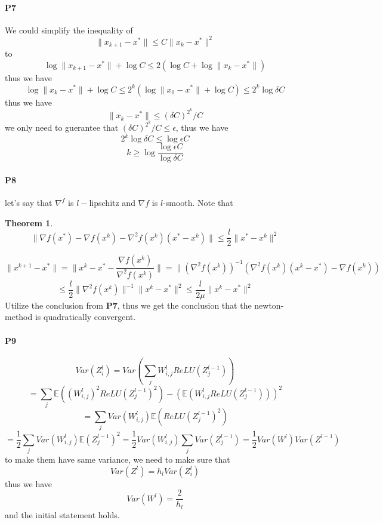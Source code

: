 \documentclass[a4 paper,12pt]{article}
\theoremstyle{definitionstyle}
\newtheorem{thm}{Theorem}
\newenvironment{framedminipage}
    {\begin{framed}\begin{minipage}{0.9\textwidth}}
    {\end{minipage}\end{framed}}
\begin{document}
\paragraph{P7}
We could simplify the inequality of 
\[
  \|x_{k+1}-x^*\|\le C\|x_k-x^*\|^2
\]
to 
\[
  \log\|x_{k+1}-x^*\|+\log C\le 2\left(\log C+\log\|x_k-x^*\|\right)
\]
thus we have
\[
  \log \|x_k-x^*\|+\log C\le 2^k\left(\log\|x_0-x^*\|+\log C\right)\le 2^k \log\delta C
\]
thus we have
\[
  \|x_k-x^*\|\le (\delta C)^{2^k}/C
\]
we only need to guerantee that $(\delta C)^{2^k}/C\le\epsilon$, thus we have
\[
  2^k\log\delta C\le\log\epsilon C
\]
\[
  k\ge\log{\frac{\log\epsilon C}{\log\delta C}}
\]
\paragraph{P8}
let's say that $\nabla^f$ is $l-$lipschitz and $\nabla f$ is $l$-smooth. Note that
\begin{framedminipage}
  \begin{thm}
  \[
    \|\nabla f(x^*)-\nabla f(x^k)-\nabla^2 f(x^k)(x^*-x^k)\|\le\frac{l}{2}\|x^*-x^k\|^2
  \]
  \end{thm}
  \end{framedminipage}
\[
  \|x^{k+1}-x^*\|=\|x^k-x^*-\frac{\nabla f(x^k)}{\nabla^2 f(x^k)}\|=\|(\nabla^2 f(x^k))^{-1}\left(\nabla^2f(x^k)(x^k-x^*)-\nabla f(x^k)\right)
\]
\[
  \le\frac{l}{2}\|\nabla^2 f(x^k)\|^{-1}\|x^k-x^*\|^2\le\frac{l}{2\mu}\|x^k-x^*\|^2
\]
Utilize the conclusion from \textbf{P7}, thus we get the conclusion that the newton-method is quadratically convergent.
\paragraph{P9}
\[
  Var(Z_i^l)=Var\left(\sum_j W_{i,j}^l ReLU(Z_j^{l-1})\right)
\]
\[
  =\sum_j \mathbb{E}\left((W_{i,j}^l)^2ReLU(Z_j^{l-1})^2\right)-\left(\mathbb{E}\left(W_{i,j}^lReLU(Z_{j}^{l-1})\right)\right)^2
\]
\[
  =\sum_j Var(W_{i,j}^l)\mathbb{E}\left(ReLU(Z_j^{l-1})^2\right)
\]
\[
  =\frac{1}{2}\sum_j Var(W_{i,j}^l)\mathbb{E}(Z_{j}^{l-1})^2=\frac{1}{2}Var(W_{i,j}^l)\sum_j Var(Z_j^{l-1})=\frac{1}{2}Var(W^l)Var(Z^{l-1})
\]
to make them have same variance, we need to make sure that
\[
  Var(Z^l)=h_lVar(Z_i^l)
\]
thus we have
\[
  Var(W^l)=\frac{2}{h_l}
\]
and the initial statement holds.
\end{document}
